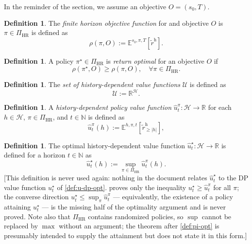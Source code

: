 \documentclass[letterpaper]{article}
\theoremstyle{plain}
\theoremstyle{definition}
\newtheorem{definition}[theorem]{Definition}
\theoremstyle{remark}
\newcommand{\Nats}{\mathbb{N}}
\newcommand{\Real}{\mathbb{R}}
\newcommand{\E}{\mathbb{E}}
\newcommand{\opt}{^{\star}}
\newcommand{\PiHR}{\Pi_{\mathrm{HR}}}
\newcommand{\rew}{\tilde{r}^{\mathrm{h}}}
\newcommand{\cc}[1]{\textcolor{ccolor}{[#1]}}
\newcommand{\lean}[1]{\textcolor{blue}{(\emph{LEAN}: \texttt{#1})}}
\newcommand{\leanok}{}
\begin{document}
In the reminder of the section, we assume an objective $O = (s_0, T)$.
\begin{definition} \label{sec:objective-fh}
  The \emph{finite horizon objective function} for and objective $O$ is $\pi\in \PiHR$ is defined as
  \[
    \rho(\pi, O)
    :=
    \E^{s_0, \pi, T} \left[\rew \right].
  \]
\end{definition}

\begin{definition}\label{def:return-optimal-fh}
  A policy $\pi\opt\in \PiHR$ is \emph{return optimal} for an objective $O$ if
  \[
   \rho(\pi\opt, O) \ge \rho(\pi, O), \quad \forall \pi \in \PiHR.
 \]
\end{definition}

\begin{definition} \label{def:values-h}
  The \emph{set of history-dependent value functions} $\mathcal{U}$ is defined as
  \[
   \mathcal{U} := \Real^{\mathcal{H}}.
 \]
\end{definition}

\begin{definition} \label{def:u-pi}
A \emph{history-dependent policy value function} $\hat{u}^{\pi}_t\colon \mathcal{H} \to \Real$ for each $h\in \mathcal{H}$, $\pi \in \PiHR$, and $t\in \Nats$ is defined as
  \[
   \hat{u}^{\pi}_t(h) := \E^{h, \pi, t} \left[ \rew_{\ge |h|} \right],
 \]
\end{definition}


\begin{definition}
The optimal history-dependent value function $\hat{u}_t\opt\colon \mathcal{H} \to \Real$ is defined for a horizon $t\in \Nats$ as
 \[
  \hat{u}\opt_t(h) := \sup_{\pi\in \PiHR} \hat{u}_t^{\pi}(h). 
 \] 
\cc{This definition is never used again: nothing in the document relates $\hat{u}\opt_t$ to the DP value function $u\opt_t$ of \cref{def:u-dp-opt}. \Cref{thm:dph-opt-vf-opt} proves only the inequality $u\opt_t \ge \hat{u}^{\pi}_t$ for all $\pi$; the converse direction $u\opt_t \le \sup_{\pi}\hat{u}^{\pi}_t$ --- equivalently, the existence of a policy attaining $u\opt_t$ --- is the missing half of the optimality argument and is never proved. Note also that $\PiHR$ contains randomized policies, so $\sup$ cannot be replaced by $\max$ without an argument; the theorem after \cref{def:pi-opt} is presumably intended to supply the attainment but does not state it in this form.}
\end{definition}
\end{document}
